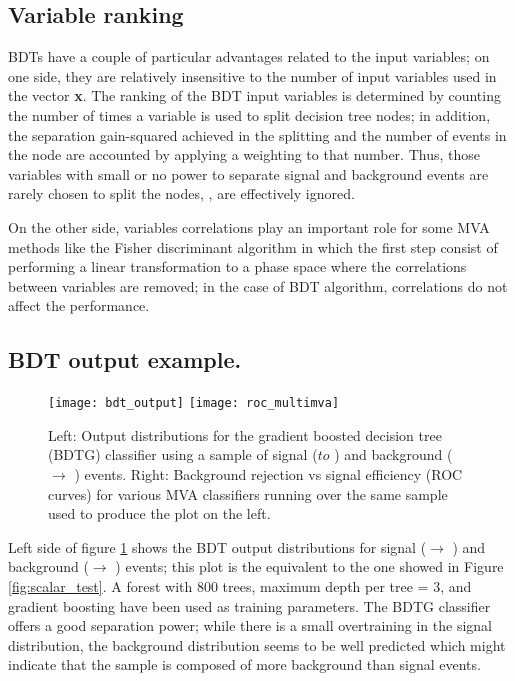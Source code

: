 \subsection{Variable ranking}

BDTs have a couple of particular advantages related to the input variables; on one side, they are relatively insensitive to the number of input variables used in the vector \textbf{x}. The ranking of the BDT input variables is determined by counting the number of times a variable is used to split decision tree nodes; in addition, the separation gain-squared achieved in the splitting and the number of events in the node are accounted by applying a weighting to that number. Thus, those variables with small or no power to separate signal and background events are rarely chosen to split the nodes, \ie, are effectively ignored.

On the other side, variables correlations play an important role for some MVA methods like the Fisher discriminant algorithm in which the first step consist of performing a linear transformation to a phase space where the correlations between variables are removed; in the case of BDT algorithm, correlations do not affect the performance.

\subsection{BDT output example.}

\begin{figure}[!h]
  \centering
  \texttt{[image: bdt\_output]}
  \texttt{[image: roc\_multimva]}
  \caption[BDT output example.]{Left: Output distributions for the gradient boosted decision tree (BDTG) classifier using a sample of signal (\pp $to$ \tHq) and background (\pp $\to$ \ttbar) events. Right: Background rejection vs signal efficiency (ROC curves) for various MVA classifiers running over the same sample used to produce the plot on the left.}\label{fig:bdt_output}
\end{figure}


Left side of figure \ref{fig:bdt_output} shows the BDT output distributions for signal (\pp $\to$ \tHq) and background (\pp $\to$ \ttbar) events; this plot is the equivalent to the one showed in Figure \ref{fig:scalar_test}. A forest with 800 trees, maximum depth per tree = 3, and gradient boosting have been used as training parameters. The BDTG classifier offers a good separation power; while there is a small overtraining in the signal distribution, the background distribution seems to be well predicted which might indicate that the sample is composed of more background than signal events.

